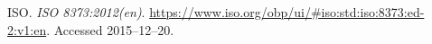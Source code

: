 \begin{thebibliography}{50}
     ISO. \textsl{ISO 8373:2012(en)}. %
    \url{https://www.iso.org/obp/ui/#iso:std:iso:8373:ed-2:v1:en}. Accessed 2015--12--20.
\end{thebibliography}
